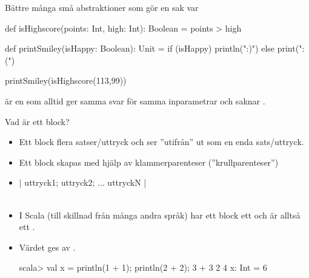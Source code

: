 \begin{Slide}{Bättre många små abstraktioner som gör en sak var}

\begin{Code}[basicstyle=\ttfamily\fontsize{8}{11}\selectfont]
def isHighscore(points: Int, high: Int): Boolean = points > high

def printSmiley(isHappy: Boolean): Unit = 
  if (isHappy) println(":)") else print(":(")
\end{Code}

\pause\vspace{2em}
\begin{REPLnonum}
  printSmiley(isHighscore(113,99))
\end{REPLnonum}

\pause\vspace{2em}  är en  som alltid ger samma svar för samma inparametrar och saknar .

\end{Slide}



\begin{Slide}{Vad är ett block?}

\begin{itemize}
\item Ett block  flera satser/uttryck och ser ''utifrån'' ut som en enda sats/uttryck.

\item Ett block skapas med hjälp av klammerparenteser (''krullparenteser'')

\item [] {\fontsize{14}{18}\selectfont \code|{ uttryck1; uttryck2; ... uttryckN }|}\\~

\pause

\item I Scala (till skillnad från många andra språk) har ett block ett  och är alltså ett . 

\item Värdet ges av .

\begin{REPLnonum}
scala> val x = { println(1 + 1); println(2 + 2); 3 + 3 } 
2
4
x: Int = 6
\end{REPLnonum}


\end{itemize}

\end{Slide}


